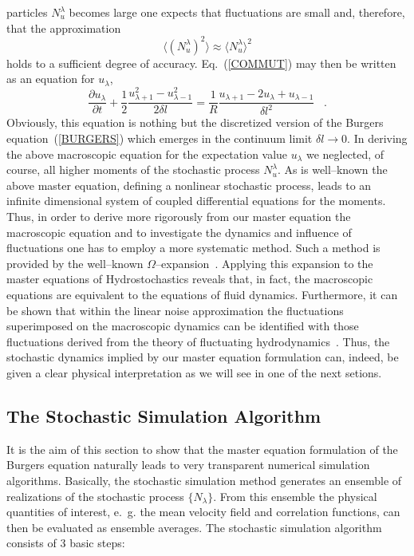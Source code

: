 particles $N_u^{\lambda}$ becomes large one expects that
fluctuations are
small and, therefore, that the approximation
\begin{equation}
\langle \left( N_u^{\lambda} \right)^2 \rangle \approx
\langle N_u^{\lambda} \rangle^2
\end{equation}
holds to a sufficient degree of accuracy.
Eq.~(\ref{COMMUT}) may then be
written as an equation for $u_{\lambda}$,
\begin{equation}
\frac{\partial u_{\lambda}}{\partial t} +
\frac{1}{2} \frac{u_{\lambda +1}^2 -
u_{\lambda -1}^2}{2\delta l} =
\frac{1}{R} \frac{u_{\lambda +1} -2u_{\lambda}
+ u_{\lambda -1}}{\delta l^2} \;\;\; .
\end{equation}
Obviously, this equation is nothing but the discretized
version of the
Burgers equation~(\ref{BURGERS}) which emerges in the continuum
limit
$\delta l \longrightarrow 0$.
In deriving the above macroscopic equation for the expectation value
$u_{\lambda}$ we neglected, of course, all higher moments of
the stochastic
process $N_u^{\lambda}$. As is well--known the above master
equation,
defining a nonlinear stochastic process, leads to an infinite
dimensional
system of coupled differential equations for the moments. Thus,
in order to
derive more rigorously from our master equation
the macroscopic equation and to investigate the
dynamics and influence of fluctuations one has to
employ a more systematic
method. Such a method is provided by the well--known
$\Omega$--expansion~\cite{KAMPEN}. Applying this
expansion to the master
equations of Hydrostochastics reveals that, in fact,
the macroscopic
equations are equivalent to the equations of fluid dynamics.
Furthermore,
it can be shown that within the linear noise approximation the
fluctuations
superimposed on the macroscopic dynamics can be identified with
those
fluctuations derived from the theory of fluctuating
hydrodynamics~\cite{LANDAU}.
Thus, the stochastic dynamics implied by our master equation
formulation
can, indeed, be given a clear physical interpretation as we will see in one of
the next setions.

\subsection{The Stochastic Simulation Algorithm}
It is the aim of this section to show that the master equation formulation
of the Burgers equation naturally leads to very transparent numerical
simulation algorithms.
Basically, the stochastic simulation method generates an ensemble of
realizations of the stochastic process $\{ N_{\lambda} \}$.
From this ensemble
the physical quantities of interest, e.~g. the mean velocity field
and correlation functions,
can then be evaluated as ensemble averages.
The stochastic simulation algorithm consists of 3 basic steps:

